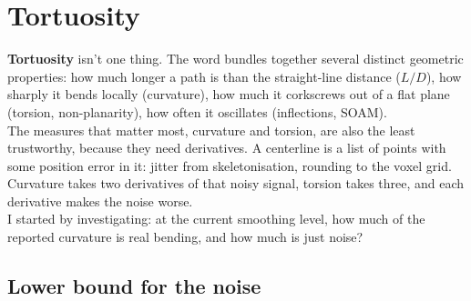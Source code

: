 %

\section*{Tortuosity}

\textbf{Tortuosity} isn't one thing. The word bundles together several distinct geometric
properties: how much longer a path is than the straight-line distance ($L/D$), how sharply it
bends locally (curvature), how much it corkscrews out of a flat plane (torsion, non-planarity),
how often it oscillates (inflections, SOAM). \\
The measures that matter most, curvature and torsion, are also the least trustworthy, because
they need derivatives. A centerline is a list of points with some position error in it: jitter
from skeletonisation, rounding to the voxel grid. Curvature takes two derivatives of that noisy
signal, torsion takes three, and each derivative makes the noise worse. \\

I started by investigating: at the current smoothing level, how much of the reported curvature
is real bending, and how much is just noise?


\subsection*{Lower bound for the noise}

